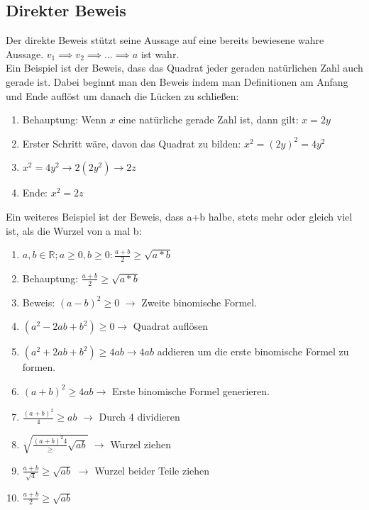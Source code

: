 \documentclass{article}
\newcommand{\R}{\mathbb{R}}
\begin{document}
	\subsection{Direkter Beweis}
	Der direkte Beweis stützt seine Aussage auf eine bereits bewiesene wahre Aussage. $v_1 \implies v_2 \implies ... \implies a$ ist wahr. \\
	Ein Beispiel ist der Beweis, dass das Quadrat jeder geraden natürlichen Zahl auch gerade ist. Dabei beginnt man den Beweis indem man Definitionen am Anfang und Ende auflöst um danach die Lücken zu schließen:
	\begin{enumerate}
		\item{Behauptung: Wenn $x$ eine natürliche gerade Zahl ist, dann gilt: $x = 2y$}
		\item{Erster Schritt wäre, davon das Quadrat zu bilden: $x^2 = (2y)^2 = 4y^2$}
		\item{$x^2 = 4y^2 \to 2(2y^2) \to 2z$}
		\item{Ende: $x^2 = 2z$}
	\end{enumerate}
	Ein weiteres Beispiel ist der Beweis, dass a+b halbe, stets mehr oder gleich viel ist, als die Wurzel von a mal b: \\
	\begin{enumerate}
		\item{$a,b \in\R; a \geq 0, b\geq 0: \frac{a+b}{2} \geq \sqrt{a*b}$}
		\item{Behauptung: $\frac{a+b}{2} \geq \sqrt{a*b}$}
		\item{Beweis: $(a-b)^2 \geq 0$ $\to$ Zweite binomische Formel.}
		\item{$(a^2-2ab+b^2)\geq 0 \to$ Quadrat auflösen}
		\item{$(a^2+2ab+b^2)\geq 4ab \to 4ab$ addieren um die erste binomische Formel zu formen.}
		\item{$(a+b)^2 \geq 4ab \to$ Erste binomische Formel generieren.}
		\item{$\frac{(a+b)^2}{4} \geq ab$ $\to$ Durch 4 dividieren}
		\item{$\sqrt{\frac{(a+b)^2{4}}\geq \sqrt{ab}}$ $\to$ Wurzel ziehen}
		\item{$\frac{a+b}{\sqrt{4}}\geq \sqrt{ab}$ $\to$ Wurzel beider Teile ziehen}
		\item{$\frac{a+b}{2}\geq \sqrt{ab}$}
	\end{enumerate}
\end{document}
